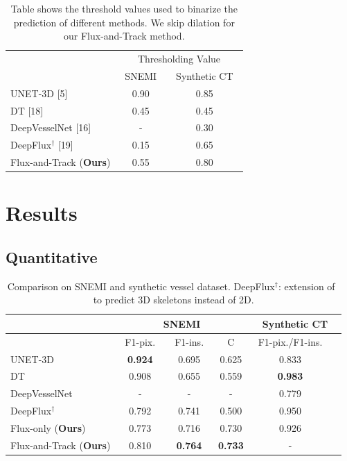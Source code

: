 \begin{table}[t]
	\centering
	\begin{tabular}{l|cc}
		& \multicolumn{2}{c}{Thresholding Value}\\
		&~SNEMI~&~Synthetic CT~ \\
		\hline
		UNET-3D [5]           &  0.90 & 0.85\\
		DT [18]                 &  0.45 & 0.45\\
		DeepVesselNet [16]        &  -    & 0.30\\
		DeepFlux$^{\dagger}$ [19]   & 0.15  & 0.65\\
		Flux-and-Track (\textbf{Ours})         & 0.55  & 0.80 \\
		\hline
	\end{tabular}
	\caption{\label{tab:baseline_params}Table shows the threshold values used to binarize the prediction of different methods. We skip dilation for our Flux-and-Track method.}
\end{table}

\section{Results}

\subsection{Quantitative}

\begin{table}[htpb]
	\centering
	\begin{tabular}{lccc|cc}
		& \multicolumn{3}{c}{SNEMI} & \multicolumn{2}{c}{Synthetic CT}\\
		\hline
		& ~F1-pix.~&~F1-ins.~&~C~&~F1-pix./F1-ins.~ \\\hline
		UNET-3D~\cite{cciccek20163d}           & \textbf{0.924}  & 0.695 & 0.625  & 0.833\\
		DT~\cite{wang2019deep}                 & 0.908  & 0.655 & 0.559  & \textbf{0.983}\\
		DeepVesselNet~\cite{Tetteh2018}        & -      & -     &  -     & 0.779\\
		DeepFlux$^{\dagger}$~\cite{Wang2019}   & 0.792  & 0.741 & 0.500  & 0.950\\\hline
		Flux-only (\textbf{Ours})              &    0.773   & 0.716 & 0.730  & 0.926\\
		Flux-and-Track (\textbf{Ours})  & 0.810 & \textbf{0.764} & \textbf{0.733} & - \\
		\hline
	\end{tabular}
	\caption{\label{tab:exp_em}Comparison on SNEMI and synthetic vessel dataset. DeepFlux$^{\dagger}$: extension of~\cite{Wang2019} to predict 3D skeletons instead of 2D.}
\end{table}

